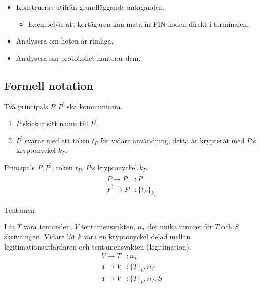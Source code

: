 \documentclass{beamer}
\begin{document}
\begin{frame}{\insertsubsectionhead}
  \begin{itemize}
    \item Konstrueras utifrån grundläggande antaganden.
      \begin{itemize}
        \item Exempelvis att kortägaren kan mata in PIN-koden direkt 
          i terminalen.
    \end{itemize}
    \item Analysera om hoten är rimliga.
    \item Analysera om protokollet hanterar dem.
  \end{itemize}
\end{frame}

\subsection{Formell notation}

\begin{frame}{\insertsubsectionhead}
  \begin{example}[Protokollbeskrivning]
    Två principals \(P, P^\prime\) ska kommunicera.
    \begin{enumerate}
      \item \(P\) skickar sitt namn till \(P^\prime\).
      \item \(P^\prime\) svarar med ett token \(t_P\) för vidare användning, 
        detta är krypterat med \(P\):s kryptonyckel \(k_P\).
    \end{enumerate}
  \end{example}
  \begin{example}
    Principals \(P, P^\prime\), token \(t_P\), \(P\):s kryptonyckel \(k_P\).
    \begin{align*}
      P\to P^\prime&\colon P \\
      P^\prime\to P&\colon \{t_P\}_{k_P}
    \end{align*}
  \end{example}
\end{frame}

\begin{frame}{\insertsubsectionhead}{Tentamen}
  \begin{example}
    Låt \(T\) vara tentanden, \(V\) tentamensvakten, \(n_T\) det unika numret 
    för \(T\) och \(S\) skrivningen.
    Vidare låt \(k\) vara en kryptonyckel delad mellan legitimationsutfärdaren 
    och tentamensvakten (legitimation).
    \begin{align*}
      V\to T&\colon n_T \\
      T\to V&\colon \{T\}_k, n_T \\
      T\to V&\colon \{T\}_k, n_T, S
    \end{align*}
  \end{example}
\end{frame}
\end{document}
